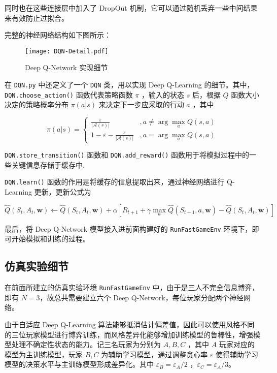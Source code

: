 同时也在这些连接层中加入了 DropOut 机制，它可以通过随机丢弃一些中间结果来有效防止过拟合\cite{srivastava2014dropout}。

完整的神经网络结构如下图所示：

\begin{figure}[H]
    \centering
    \texttt{[image: DQN-Detail.pdf]}
    \caption{Deep Q-Network 实现细节}
\end{figure}

在 \texttt{DQN.py} 中还定义了一个 \texttt{DQN} 类，用以实现 Deep Q-Learning 的细节。其中，\texttt{DQN.choose\_action()} 函数代表策略函数 $\pi$ ，输入的状态 $s$ 后，根据 $Q$ 函数大小决定的策略概率分布 $\pi(a|s)$ 来决定下一步应采取的行动 $a$ ，其中

\begin{equation}
    \pi(a|s)=
    \begin{cases}
        \frac{\varepsilon}{|\mathcal A(s)|}&, a\neq\arg\max_aQ(s,a)\\
        1-\varepsilon-\frac{\varepsilon}{|\mathcal A(s)|}&, a=\arg\max_aQ(s,a)
    \end{cases}
\end{equation}

\texttt{DQN.store\_transition()} 函数和 \texttt{DQN.add\_reward()} 函数用于将模拟过程中的一些关键信息存储于缓存中.

\texttt{DQN.learn()} 函数的作用是将缓存的信息提取出来，通过神经网络进行 Q-Learning 更新，更新公式为

\begin{equation}
    \widehat{Q}(S_t,A_t,\boldsymbol{w})\leftarrow \widehat{Q}(S_t,A_t,\boldsymbol{w})+\alpha\left[R_{t+1}+\gamma  \max\limits_a \widehat{Q}(S_{t+1},a,\boldsymbol{w})-\widehat{Q}(S_t,A_t,\boldsymbol{w})\right]
\end{equation}

最后，将 Deep Q-Network 模型接入进前面构建好的 \texttt{RunFastGameEnv} 环境下，即可开始模拟和训练的过程。

\subsection{仿真实验细节}

在前面所建立的仿真实验环境 \texttt{RunFastGameEnv} 中，由于是三人不完全信息博弈，即有 $N=3$，故总共需要建立六个 Deep Q-Network，每位玩家分配两个神经网络。

由于自适应 Deep Q-Learning 算法能够抵消估计偏差值，因此可以使用风格不同的三位玩家模型进行博弈训练，而风格差异化能够增加训练模型的鲁棒性，增强模型处理不确定性状态的能力。记三名玩家为分别为 $A,B,C$ ，其中 $A$ 玩家对应的模型为主训练模型，玩家 $B,C$ 为辅助学习模型，通过调整贪心率 $\varepsilon$ 使得辅助学习模型的决策水平与主训练模型形成差异化。其中 $\varepsilon_B = \varepsilon_A / 2$ ，$\varepsilon_C = \varepsilon_A / 3$。

